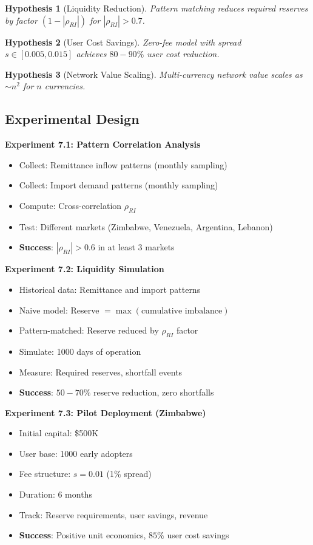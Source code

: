 \documentclass[12pt]{article}
\newtheorem{hypothesis}{Hypothesis}
\begin{document}
\begin{hypothesis}[Liquidity Reduction]
Pattern matching reduces required reserves by factor $(1 - |\rho_{RI}|)$ for $|\rho_{RI}| > 0.7$.
\end{hypothesis}

\begin{hypothesis}[User Cost Savings]
Zero-fee model with spread $s \in [0.005, 0.015]$ achieves $80-90\%$ user cost reduction.
\end{hypothesis}

\begin{hypothesis}[Network Value Scaling]
Multi-currency network value scales as $\sim n^2$ for $n$ currencies.
\end{hypothesis}

\subsection{Experimental Design}

\textbf{Experiment 7.1: Pattern Correlation Analysis}
\begin{itemize}
    \item Collect: Remittance inflow patterns (monthly sampling)
    \item Collect: Import demand patterns (monthly sampling)
    \item Compute: Cross-correlation $\rho_{RI}$
    \item Test: Different markets (Zimbabwe, Venezuela, Argentina, Lebanon)
    \item \textbf{Success}: $|\rho_{RI}| > 0.6$ in at least 3 markets
\end{itemize}

\textbf{Experiment 7.2: Liquidity Simulation}
\begin{itemize}
    \item Historical data: Remittance and import patterns
    \item Naive model: Reserve $= \max(\text{cumulative imbalance})$
    \item Pattern-matched: Reserve reduced by $\rho_{RI}$ factor
    \item Simulate: 1000 days of operation
    \item Measure: Required reserves, shortfall events
    \item \textbf{Success}: $50-70\%$ reserve reduction, zero shortfalls
\end{itemize}

\textbf{Experiment 7.3: Pilot Deployment (Zimbabwe)}
\begin{itemize}
    \item Initial capital: \$500K
    \item User base: 1000 early adopters
    \item Fee structure: $s = 0.01$ (1\% spread)
    \item Duration: 6 months
    \item Track: Reserve requirements, user savings, revenue
    \item \textbf{Success}: Positive unit economics, $85\%$ user cost savings
\end{itemize}
\end{document}
